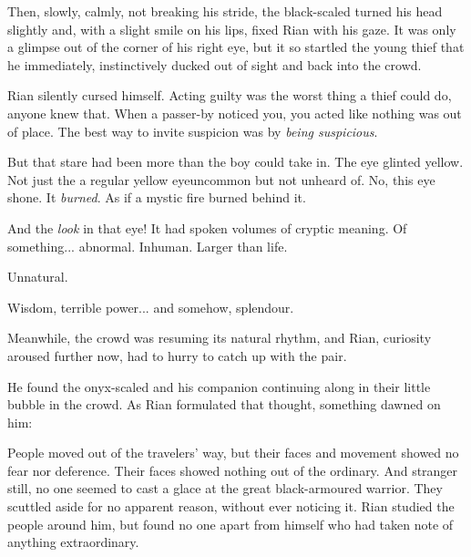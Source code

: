 Then, slowly, calmly, not breaking his stride, the black-scaled \dax{} turned his head slightly and, with a slight smile on his lips, fixed Rian with his gaze. It was only a glimpse out of the corner of his right eye, 
but it so startled the young thief
that he immediately, instinctively ducked out of sight and back into the crowd. 

Rian silently cursed himself. 
 Acting guilty was the worst thing a thief could do, anyone knew that. When a passer-by noticed you, you acted like nothing was out of place. The best way to invite suspicion was by \emph{being suspicious}. 

But that stare had been more than the boy could take in. 
The eye glinted yellow. 
Not just the a regular yellow eye\dash uncommon but not unheard of. 
No, this eye shone. It \emph{burned}. 
As if a mystic fire burned behind it. 

And the \emph{look} in that eye! It had spoken volumes of cryptic meaning. Of something... abnormal. Inhuman. Larger than life. 

Unnatural. 

Wisdom, terrible power... and somehow, splendour. 


Meanwhile, the crowd was resuming its natural rhythm, and Rian, curiosity aroused further now, had to hurry to catch up with the pair. 

He found the onyx-scaled \dax{} and his companion continuing along in their little bubble in the crowd. As Rian formulated that thought, something dawned on him: 


People moved out of the travelers' way, but their faces and movement showed no fear nor deference. Their faces showed nothing out of the ordinary. And stranger still, no one seemed to cast a glace at the great black-armoured warrior. They scuttled aside for no apparent reason, without ever noticing it. Rian studied the people around him, but found no one apart from himself who had taken note of anything extraordinary.


